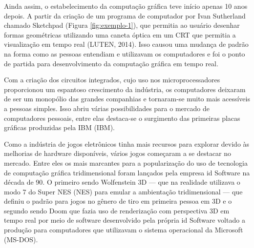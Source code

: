 Ainda assim, o estabelecimento da computação gráfica teve início apenas 10 anos depois. A partir da criação de um programa de computador por Ivan Sutherland chamado Sketchpad (Figura \ref{fig:exemplo-1}), que permitia ao usuário desenhar formas geométricas utilizando uma caneta óptica em um \acrshort{CRT} que permitia a visualização em tempo real (LUTEN, 2014)\nocite{openGLBook}. Isso causou uma mudança de padrão na forma como as pessoas entendiam e utilizavam os computadores e foi o ponto de partida para desenvolvimento da computação gráfica em tempo real.
	
Com a criação dos circuitos integrados, cujo uso nos microprocessadores proporcionou um espantoso crescimento da indústria, os computadores deixaram de ser um monopólio das grandes companhias e tornaram-se muito mais acessíveis a pessoas simples. Isso abriu várias possibilidades para o mercado de computadores pessoais, entre elas destaca-se o surgimento das primeiras placas gráficas produzidas pela IBM (\acrlong{IBM}).

%     
	
Como a indústria de jogos eletrônicos tinha mais recursos para explorar devido às melhorias de hardware disponíveis, vários jogos começaram a se destacar no mercado. Entre eles os mais marcantes para a popularização do uso de tecnologia de computação gráfica tridimensional foram lançados pela empresa id Software na década de 90. O primeiro sendo Wolfenstein 3D --- que na realidade utilizava o modo 7 do Super NES (\acrlong{NES}) para emular a ambientação tridimensional --- que definiu o padrão para jogos no gênero de tiro em primeira pessoa em 3D e o segundo sendo Doom que fazia uso de renderização com perspectiva 3D em tempo real por meio de software desenvolvido pela própria id Software voltado a produção para computadores que utilizavam o sistema operacional da Microsoft (\acrshort{MS-DOS}).

    \begin{figure}[h!]
		\centering
	\end{figure}
	\nocite{figura3}
	
